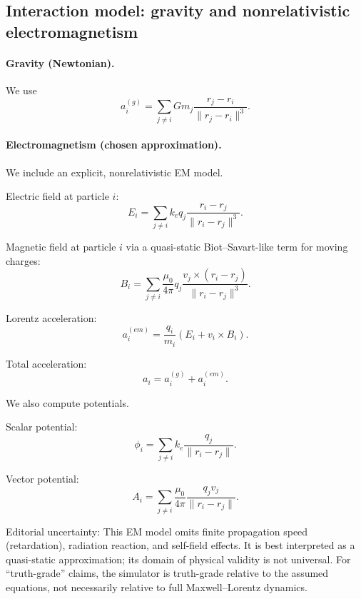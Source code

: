 \documentclass[11pt]{article}
\begin{document}
\subsection{Interaction model: gravity and nonrelativistic electromagnetism}
\paragraph{Gravity (Newtonian).}
We use
\begin{equation*}
a_i^{(g)} = \sum_{j \ne i} G m_j \frac{r_j - r_i}{\|r_j - r_i\|^3}.
\end{equation*}

\paragraph{Electromagnetism (chosen approximation).}
We include an explicit, nonrelativistic EM model.

Electric field at particle $i$:
\begin{equation*}
E_i = \sum_{j \ne i} k_e q_j \frac{r_i - r_j}{\|r_i - r_j\|^3}.
\end{equation*}

Magnetic field at particle $i$ via a quasi-static Biot--Savart-like term for moving charges:
\begin{equation*}
B_i = \sum_{j \ne i} \frac{\mu_0}{4\pi} q_j \frac{v_j \times (r_i - r_j)}{\|r_i - r_j\|^3}.
\end{equation*}

Lorentz acceleration:
\begin{equation*}
a_i^{(em)} = \frac{q_i}{m_i}\left(E_i + v_i \times B_i\right).
\end{equation*}

Total acceleration:
\begin{equation*}
a_i = a_i^{(g)} + a_i^{(em)}.
\end{equation*}

We also compute potentials.

Scalar potential:
\begin{equation*}
\phi_i = \sum_{j \ne i} k_e \frac{q_j}{\|r_i - r_j\|}.
\end{equation*}

Vector potential:
\begin{equation*}
A_i = \sum_{j \ne i} \frac{\mu_0}{4\pi} \frac{q_j v_j}{\|r_i - r_j\|}.
\end{equation*}

Editorial uncertainty: This EM model omits finite propagation speed (retardation), radiation reaction, and self-field effects. It is best interpreted as a quasi-static approximation\cite{Darwin1920}; its domain of physical validity is not universal. For ``truth-grade'' claims, the simulator is truth-grade relative to the assumed equations, not necessarily relative to full Maxwell--Lorentz dynamics.
\end{document}
